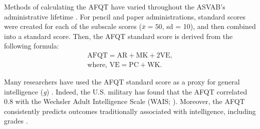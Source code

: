 \documentclass[a4paper,man,apacite,natbib,12pt,longtable]{apa6}\usepackage[]{graphicx}\usepackage[]{color}
\begin{document}
Methods of calculating the AFQT have varied throughout the ASVAB's administrative lifetime \citep{mayberry1992computing}. For pencil and paper administrations, standard scores were created for each of the subscale scores ($\bar{x}=50$, sd = 10), and then combined into a standard score. Then, the AFQT standard score is derived from the following formula:\begin{align}\text{AFQT} = \text{AR} + \text{MK} + 2\text{VE}, \\\text{where, VE} = \text{PC} + \text{WK.}\end{align}

Many researchers have used the AFQT standard score as a proxy for general intelligence (\textit{g}) \citep{herrnstein1994bell,Der2009}. Indeed, the U.S. military has found that the AFQT correlated 0.8 with the Wechsler Adult Intelligence Scale (WAIS; \citealp{mcgrevy1974relationships}). Moreover, the AFQT consistently predicts outcomes traditionally associated with intelligence\citep{Welsh1990}, including grades \citep{wilbourn1984,mathews1977analysis}.
\end{document}
